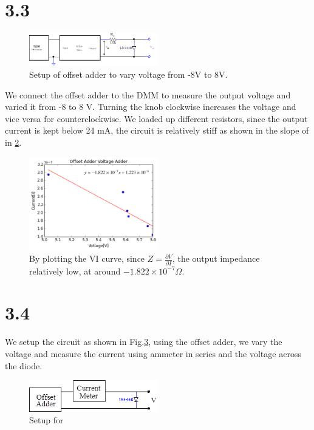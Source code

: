 \documentclass[authoryear, 12pt,5p, times]{elsarticle}
\begin{document}
\section*{3.3}
\begin{figure}[h!]
\center
\includegraphics[width=0.5\textwidth]{figure/3_3_setup}
\caption{Setup of offset adder to vary voltage from -8V to 8V.}
\label{3_3_setup}
\end{figure}
We connect the offset adder to the DMM to measure the output voltage and varied it from -8 to 8 V. Turning the knob clockwise increases the voltage and vice versa for counterclockwise. We loaded up different resistors, since the output current is kept below 24 mA, the circuit is relatively stiff as shown in the slope of in \ref{3_3}. 
\begin{figure}[h!]
\center
\includegraphics[width=0.5\textwidth]{figure/3_3}
\caption{By plotting the VI curve, since $Z=\frac{\partial V}{\partial I}$, the output  impedance relatively low, at around $-1.822\times10^{-7} \Omega$.}
\label{3_3}
\end{figure}
\section*{3.4}
We setup the circuit as shown in Fig.\ref{3_4_diag}, using the offset adder, we vary the voltage and measure the current using ammeter in series and the voltage across the diode. 
\begin{figure}[h!]
\center
\includegraphics[width=0.5\textwidth]{figure/3_4_diag}
\caption{Setup for }
\label{3_4_diag}
\end{figure}
\end{document}
